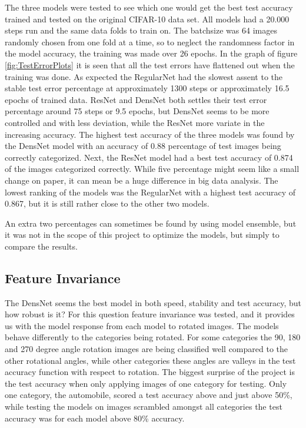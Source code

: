 The three models were tested to see which one would get the best test accuracy trained and tested on the original CIFAR-10 data set. All models had a 20.000 steps run and the same data folds to train on. The batchsize was 64 images randomly chosen from one fold at a time, so to neglect the randomness factor in the model accuracy, the training was made over 26 epochs. In the graph of figure \ref{fig:TestErrorPlots} it is seen that all the test errors have flattened out when the training was done. As expected the RegularNet had the slowest assent to the stable test error percentage at approximately 1300 steps or approximately 16.5 epochs of trained data. ResNet and DensNet both settles their test error percentage around 75 steps or 9.5 epochs, but DensNet seems to be more controlled and with less deviation, while the ResNet more variate in the increasing accuracy. The highest test accuracy of the three models was found by the DensNet model with an accuracy of 0.88 percentage of test images being correctly categorized. Next, the ResNet model had a best test accuracy of 0.874 of the images categorized correctly. While five percentage might seem like a small change on paper, it can mean be a huge difference in big data analysis. The lowest ranking of the models was the RegularNet with a highest test accuracy of 0.867, but it is still rather close to the other two models.

An extra two percentages can sometimes be found by using model ensemble, but it was not in the scope of this project to optimize the models, but simply to compare the results.

\subsection{Feature Invariance}

The DensNet seems the best model in both speed, stability and test accuracy, but how robust is it? For this question feature invariance was tested, and it provides us with the model response from each model to rotated images. The models behave differently to the categories being rotated. For some categories the 90, 180 and 270 degree angle rotation images are being classified well compared to the other rotational angles, while other categories these angles are valleys in the test accuracy function with respect to rotation. The biggest surprise of the project is the test accuracy when only applying images of one category for testing. Only one category, the automobile, scored a test accuracy above and just above 50\%, while testing the models on images scrambled amongst all categories the test accuracy was for each model above 80\% accuracy.

